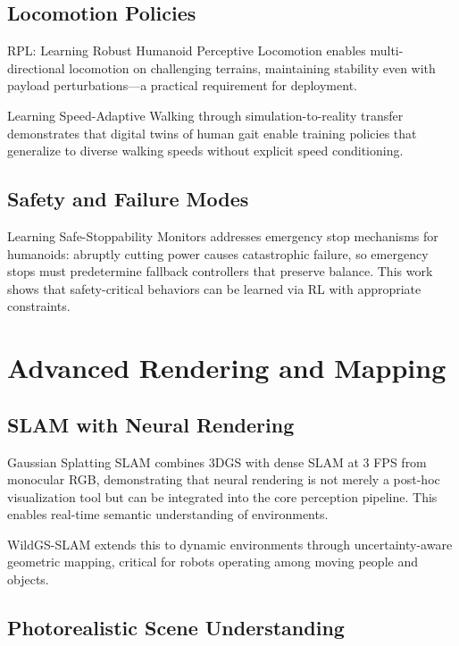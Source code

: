 \documentclass[journal]{IEEEtran}
\begin{document}
\subsection{Locomotion Policies}

RPL: Learning Robust Humanoid Perceptive Locomotion \cite{rpl2026} enables multi-directional locomotion on challenging terrains, maintaining stability even with payload perturbations---a practical requirement for deployment.

Learning Speed-Adaptive Walking through simulation-to-reality transfer demonstrates that digital twins of human gait enable training policies that generalize to diverse walking speeds without explicit speed conditioning.

\subsection{Safety and Failure Modes}

Learning Safe-Stoppability Monitors \cite{safestop2026} addresses emergency stop mechanisms for humanoids: abruptly cutting power causes catastrophic failure, so emergency stops must predetermine fallback controllers that preserve balance. This work shows that safety-critical behaviors can be learned via RL with appropriate constraints.

\section{Advanced Rendering and Mapping}

\subsection{SLAM with Neural Rendering}

Gaussian Splatting SLAM \cite{gaussslam2026} combines 3DGS with dense SLAM at 3 FPS from monocular RGB, demonstrating that neural rendering is not merely a post-hoc visualization tool but can be integrated into the core perception pipeline. This enables real-time semantic understanding of environments.

WildGS-SLAM \cite{wildgsslam2025} extends this to dynamic environments through uncertainty-aware geometric mapping, critical for robots operating among moving people and objects.

\subsection{Photorealistic Scene Understanding}
\end{document}
